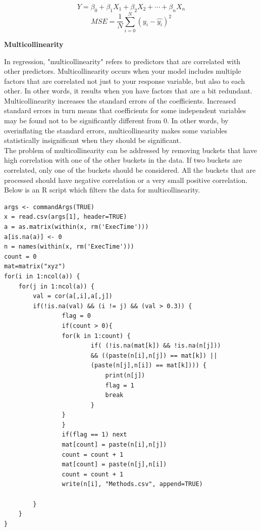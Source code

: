 \documentclass[11pt]{article}
\begin{document}
\begin{equation}
Y = \beta_{0} + \beta_{1}X_{1}+ \beta_{2}X_{2} + \dotsb+ \beta_{n}X_{n}
\end{equation}
\vspace{0.5em}
\begin{equation}
MSE = \frac{1}{N} \sum_{i=0}^{N} (y_{i} - \hat{y_{i}})^{2}
\end{equation}

\textbf{Multicollinearity}

In regression, "multicollinearity" refers to predictors that are correlated with other predictors.  Multicollinearity occurs when your model includes multiple factors that are correlated not just to your response variable, but also to each other.\citep{linearreg} In other words, it results when you have factors that are a bit redundant.
Multicollinearity increases the standard errors of the coefficients. Increased standard errors in turn means that coefficients for some independent variables may be found not to be significantly different from 0. In other words, by overinflating the standard errors, multicollinearity makes some variables statistically insignificant when they should be significant. \newline
\\The problem of multicollinearity can be addressed by removing buckets that have high correlation with one of the other buckets in the data. If two buckets are correlated, only one of the buckets should be considered. All the buckets that are processed should have negative correlation or a very small positive correlation. Below is an R script which filters the data for multicollinearity. 


\begin{lstlisting}
args <- commandArgs(TRUE)
x = read.csv(args[1], header=TRUE)
a = as.matrix(within(x, rm('ExecTime')))
a[is.na(a)] <- 0
n = names(within(x, rm('ExecTime')))
count = 0
mat=matrix("xyz")
for(i in 1:ncol(a)) {
    for(j in 1:ncol(a)) {
        val = cor(a[,i],a[,j])
        if(!is.na(val) && (i != j) && (val > 0.3)) {
                flag = 0
                if(count > 0){
                for(k in 1:count) {
                        if( (!is.na(mat[k]) && !is.na(n[j])) 
                        && ((paste(n[i],n[j]) == mat[k]) || 
                        (paste(n[j],n[i]) == mat[k]))) {
                            print(n[j])
                            flag = 1
                            break
                        }
                }
                }
                if(flag == 1) next
                mat[count] = paste(n[i],n[j])
                count = count + 1
                mat[count] = paste(n[j],n[i])
                count = count + 1
                write(n[i], "Methods.csv", append=TRUE)

        }
    }
}
\end{lstlisting}
\end{document}
